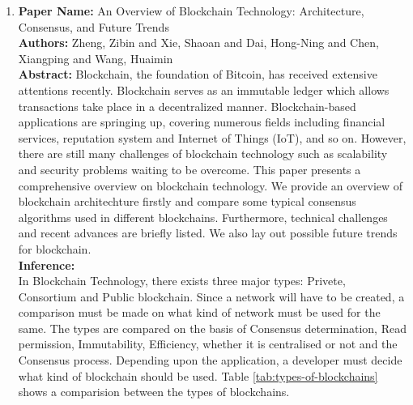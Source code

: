 \documentclass[oneside, 12pt]{book}
\begin{document}
\begin{enumerate}
\begin{itemize}
	      \end{itemize}
	\item
	      \textbf{Paper Name:} An Overview of Blockchain Technology: Architecture, Consensus, and Future Trends \cite{zheng2017overview}\\
	      \textbf{Authors:} Zheng, Zibin and Xie, Shaoan and Dai, Hong-Ning and Chen, Xiangping and Wang, Huaimin\\
	      \textbf{Abstract:} Blockchain, the foundation of Bitcoin, has received extensive attentions recently. Blockchain serves as an immutable ledger which allows transactions take place in a decentralized manner. Blockchain-based applications are springing up, covering numerous fields including financial services, reputation system and Internet of Things (IoT), and so on. However, there are still many challenges of blockchain technology such as scalability and security problems waiting to be overcome. This paper presents a comprehensive overview on blockchain technology. We provide an overview of blockchain architechture firstly and compare some typical consensus algorithms used in different blockchains. Furthermore, technical challenges and recent advances are briefly listed. We also lay out possible future trends for blockchain.\\
	      \textbf{Inference:}
	      \\In Blockchain Technology, there exists three major types: Privete, Consortium and Public blockchain. Since a network will have to be created, a comparison must be made on what kind of network must be used for the same. The types are compared on the basis of Consensus determination, Read permission, Immutability, Efficiency, whether it is centralised or not and the Consensus process. Depending upon the application, a developer must decide what kind of blockchain should be used. Table \ref{tab:types-of-blockchains} shows a comparision between the types of blockchains.
	      \begin{table}[H]
		      \centering
\end{table}
\end{enumerate}
\end{document}
